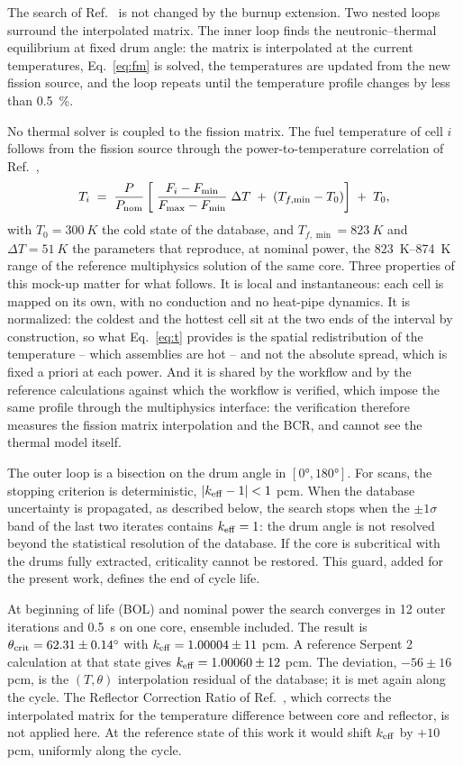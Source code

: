 \documentclass[]{ANStopical}
\begin{document}
The search of Ref.~\cite{vita2026fm} is not changed by the burnup extension. Two nested loops surround the interpolated matrix. The inner loop finds the neutronic--thermal equilibrium at fixed drum angle: the matrix is interpolated at the current temperatures, Eq.~\eqref{eq:fm} is solved, the temperatures are updated from the new fission source, and the loop repeats until the temperature profile changes by less than \SI{0.5}{\percent}.

No thermal solver is coupled to the fission matrix. The fuel temperature of cell $i$ follows from the fission source through the power-to-temperature correlation of Ref.~\cite{vita2026fm},
\begin{equation}
    T_i \;=\; \frac{P}{P_{\rm nom}}
    \left[\;\frac{F_i - F_{\min}}{F_{\max} - F_{\min}}\;\Delta T \;+\; \left(T_{f,\min} - T_0\right)\right] \;+\; T_0 ,
    \label{eq:t}
\end{equation}
with $T_0 = \SI{300}{K}$ the cold state of the database, and $T_{f,\min} = \SI{823}{K}$ and $\Delta T = \SI{51}{K}$ the parameters that reproduce, at nominal power, the \SIrange{823}{874}{K} range of the reference multiphysics solution of the same core. Three properties of this mock-up matter for what follows. It is local and instantaneous: each cell is mapped on its own, with no conduction and no heat-pipe dynamics. It is normalized: the coldest and the hottest cell sit at the two ends of the interval by construction, so what Eq.~\eqref{eq:t} provides is the spatial redistribution of the temperature -- which assemblies are hot -- and not the absolute spread, which is fixed a priori at each power. And it is shared by the workflow and by the reference calculations against which the workflow is verified, which impose the same profile through the multiphysics interface: the verification therefore measures the fission matrix interpolation and the BCR, and cannot see the thermal model itself.

The outer loop is a bisection on the drum angle in $[\ang{0},\ang{180}]$. For scans, the stopping criterion is deterministic, $|k_{\rm eff}-1| < 1$ pcm. When the database uncertainty is propagated, as described below, the search stops when the $\pm 1\sigma$ band of the last two iterates contains $k_{\rm eff}=1$: the drum angle is not resolved beyond the statistical resolution of the database. If the core is subcritical with the drums fully extracted, criticality cannot be restored. This guard, added for the present work, defines the end of cycle life.

At beginning of life (BOL) and nominal power the search converges in 12 outer iterations and \SI{0.5}{s} on one core, ensemble included. The result is $\theta_{\rm crit} = 62.31 \pm \ang{0.14}$ with $k_{\rm eff} = 1.00004 \pm 11$ pcm. A reference Serpent 2 calculation at that state gives $k_{\rm eff} = 1.00060 \pm 12$ pcm. The deviation, $-56 \pm 16$ pcm, is the $(T,\theta)$ interpolation residual of the database; it is met again along the cycle. The Reflector Correction Ratio of Ref.~\cite{vita2026fm}, which corrects the interpolated matrix for the temperature difference between core and reflector, is not applied here. At the reference state of this work it would shift $k_{\rm eff}$ by $+10$ pcm, uniformly along the cycle.
\end{document}
